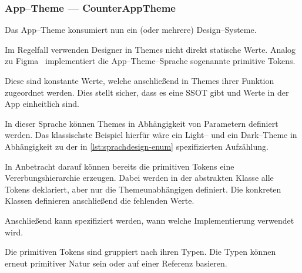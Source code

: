\subsubsection{App--Theme --- CounterAppTheme}
Das App--Theme konsumiert nun ein (oder mehrere) Design--Systeme.

Im Regelfall verwenden Designer in Themes nicht direkt statische Werte.
Analog zu Figma~\autocite{figma-inc-no-date} implementiert die App--Theme--Sprache sogenannte primitive Tokens.


Diese sind konstante Werte, welche anschließend in Themes ihrer Funktion zugeordnet werden.
Dies stellt sicher, dass es eine \ac{SSOT} gibt und Werte in der App einheitlich sind.

In dieser Sprache können Themes in Abhängigkeit von Parametern definiert werden.
Das klassischste Beispiel hierfür wäre ein Light-- und ein Dark--Theme in Abhängigkeit zu der in \autoref{lst:sprachdesign-enum} spezifizierten Aufzählung.

In Anbetracht darauf können bereits die primitiven Tokens eine Vererbungshierarchie erzeugen.
Dabei werden in der abstrakten Klasse alle Tokens deklariert, aber nur die Themeunabhängigen definiert.
Die konkreten Klassen definieren anschließend die fehlenden Werte.

Anschließend kann spezifiziert werden, wann welche Implementierung verwendet wird.

Die primitiven Tokens sind gruppiert nach ihren Typen.
Die Typen können erneut primitiver Natur sein oder auf einer Referenz basieren.

